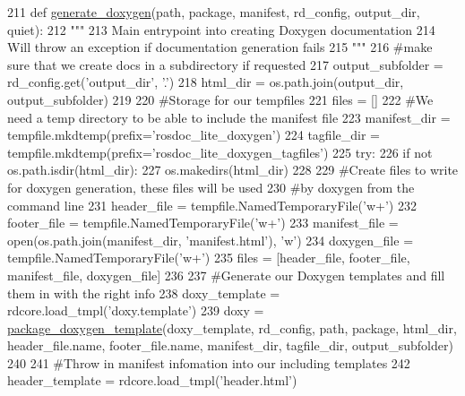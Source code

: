 \begin{DoxyCode}
211 \textcolor{keyword}{def }\hyperlink{namespacerosdoc__lite_1_1doxygenator_ac427e2c0d453f939d7a5fe911b3189fd}{generate\_doxygen}(path, package, manifest, rd\_config, output\_dir, quiet):
212     \textcolor{stringliteral}{"""}
213 \textcolor{stringliteral}{    Main entrypoint into creating Doxygen documentation}
214 \textcolor{stringliteral}{    Will throw an exception if documentation generation fails}
215 \textcolor{stringliteral}{    """}
216     \textcolor{comment}{#make sure that we create docs in a subdirectory if requested}
217     output\_subfolder = rd\_config.get(\textcolor{stringliteral}{'output\_dir'}, \textcolor{stringliteral}{'.'})
218     html\_dir = os.path.join(output\_dir, output\_subfolder)
219 
220     \textcolor{comment}{#Storage for our tempfiles}
221     files = []
222     \textcolor{comment}{#We need a temp directory to be able to include the manifest file}
223     manifest\_dir = tempfile.mkdtemp(prefix=\textcolor{stringliteral}{'rosdoc\_lite\_doxygen'})
224     tagfile\_dir = tempfile.mkdtemp(prefix=\textcolor{stringliteral}{'rosdoc\_lite\_doxygen\_tagfiles'})
225     \textcolor{keywordflow}{try}:
226         \textcolor{keywordflow}{if} \textcolor{keywordflow}{not} os.path.isdir(html\_dir):
227             os.makedirs(html\_dir)
228 
229         \textcolor{comment}{#Create files to write for doxygen generation, these files will be used}
230         \textcolor{comment}{#by doxygen from the command line}
231         header\_file = tempfile.NamedTemporaryFile(\textcolor{stringliteral}{'w+'})
232         footer\_file = tempfile.NamedTemporaryFile(\textcolor{stringliteral}{'w+'})
233         manifest\_file = open(os.path.join(manifest\_dir, \textcolor{stringliteral}{'manifest.html'}), \textcolor{stringliteral}{'w'})
234         doxygen\_file = tempfile.NamedTemporaryFile(\textcolor{stringliteral}{'w+'})
235         files = [header\_file, footer\_file, manifest\_file, doxygen\_file]
236 
237         \textcolor{comment}{#Generate our Doxygen templates and fill them in with the right info}
238         doxy\_template = rdcore.load\_tmpl(\textcolor{stringliteral}{'doxy.template'})
239         doxy = \hyperlink{namespacerosdoc__lite_1_1doxygenator_a44516376cf38c9526e0ecab0f4d41ea5}{package\_doxygen\_template}(doxy\_template, rd\_config, path, package, 
      html\_dir, header\_file.name, footer\_file.name, manifest\_dir, tagfile\_dir, output\_subfolder)
240 
241         \textcolor{comment}{#Throw in manifest infomation into our including templates}
242         header\_template = rdcore.load\_tmpl(\textcolor{stringliteral}{'header.html'})

\end{DoxyCode}
